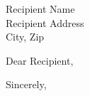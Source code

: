 \documentclass[paper=a4,fontsize=11pt]{scrlttr2}
\begin{document}
\begin{letter}{Recipient Name \\ Recipient Address \\ City, Zip}

	\opening{Dear Recipient,}

	\lipsum[1-2]

	\closing{Sincerely,}

\end{letter}
\end{document}
